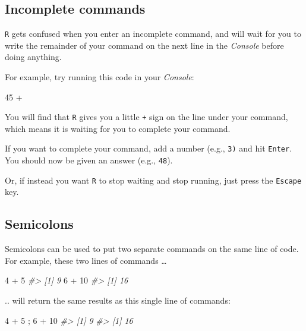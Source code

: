 \documentclass[
]{book}
\newenvironment{Shaded}{\begin{snugshade}}{\end{snugshade}}
\newcommand{\CommentTok}[1]{\textcolor[rgb]{0.56,0.35,0.01}{\textit{#1}}}
\newcommand{\DecValTok}[1]{\textcolor[rgb]{0.00,0.00,0.81}{#1}}
\newcommand{\NormalTok}[1]{#1}
\newcommand{\SpecialCharTok}[1]{\textcolor[rgb]{0.00,0.00,0.00}{#1}}
\begin{document}
\hypertarget{incomplete-commands}{%
\subsection*{Incomplete commands}\label{incomplete-commands}}

\texttt{R} gets confused when you enter an incomplete command, and will wait for you to write the remainder of your command on the next line in the \emph{Console} before doing anything.

For example, try running this code in your \emph{Console}:

\begin{Shaded}
\begin{Highlighting}[]
\DecValTok{45} \SpecialCharTok{+}
\end{Highlighting}
\end{Shaded}

You will find that \texttt{R} gives you a little \texttt{+} sign on the line under your command, which means it is waiting for you to complete your command.

If you want to complete your command, add a number (e.g., \texttt{3)} and hit \texttt{Enter}. You should now be given an answer (e.g., \texttt{48}).

Or, if instead you want \texttt{R} to stop waiting and stop running, just press the \texttt{Escape} key.

\hypertarget{semicolons}{%
\subsection*{Semicolons}\label{semicolons}}

Semicolons can be used to put two separate commands on the same line of code. For example, these two lines of commands \ldots{}

\begin{Shaded}
\begin{Highlighting}[]
\DecValTok{4} \SpecialCharTok{+} \DecValTok{5}
\CommentTok{\#\textgreater{} [1] 9}
\DecValTok{6} \SpecialCharTok{+} \DecValTok{10}
\CommentTok{\#\textgreater{} [1] 16}
\end{Highlighting}
\end{Shaded}

.. will return the same results as this single line of commands:

\begin{Shaded}
\begin{Highlighting}[]
\DecValTok{4} \SpecialCharTok{+} \DecValTok{5}\NormalTok{ ; }\DecValTok{6} \SpecialCharTok{+} \DecValTok{10}
\CommentTok{\#\textgreater{} [1] 9}
\CommentTok{\#\textgreater{} [1] 16}
\end{Highlighting}
\end{Shaded}
\end{document}
